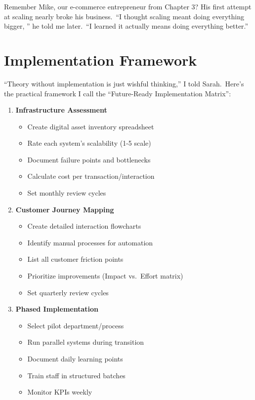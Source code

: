 Remember Mike, our e-commerce entrepreneur from Chapter 3? His first attempt at scaling nearly broke his business.\ ``I thought scaling meant doing everything bigger, '' he told me later.\ ``I learned it actually means doing everything better.''


\section{Implementation Framework}\label{sec:future-ready-implementation-framework}

``Theory without implementation is just wishful thinking,'' I told Sarah.\ Here's the practical framework I call the ``Future-Ready Implementation Matrix'':

\begin{tcolorbox}[colback=white,colframe=primarydark,title=\textbf{Digital Acceleration: Implementation Steps}]
    \begin{enumerate}
        \item \textbf{Infrastructure Assessment}
        \begin{itemize}
            \item Create digital asset inventory spreadsheet
            \item Rate each system's scalability (1-5 scale)
            \item Document failure points and bottlenecks
            \item Calculate cost per transaction/interaction
            \item Set monthly review cycles
        \end{itemize}

        \item \textbf{Customer Journey Mapping}
        \begin{itemize}
            \item Create detailed interaction flowcharts
            \item Identify manual processes for automation
            \item List all customer friction points
            \item Prioritize improvements (Impact vs.\ Effort matrix)
            \item Set quarterly review cycles
        \end{itemize}

        \item \textbf{Phased Implementation}
        \begin{itemize}
            \item Select pilot department/process
            \item Run parallel systems during transition
            \item Document daily learning points
            \item Train staff in structured batches
            \item Monitor KPIs weekly
        \end{itemize}
    \end{enumerate}
\end{tcolorbox}


